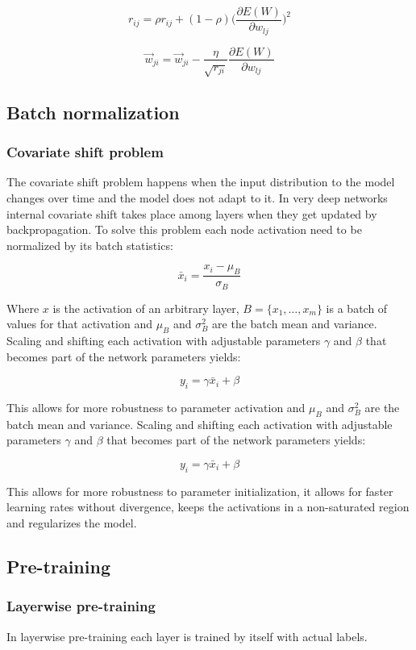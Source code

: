 		$$r_{ij} = \rho r_{ij} + (1-\rho)\biggl(\frac{\partial E(W)}{\partial w_{lj}}\biggr)^2$$

		$$\vec{w}_{ji} = \vec{w}_{ji} -\frac{\eta}{\sqrt{r_{ji}}}\frac{\partial E(W)}{\partial w_{lj}}$$

	\subsection{Batch normalization}

		\subsubsection{Covariate shift problem}
		The covariate shift problem happens when the input distribution to the model changes over time and the model does not adapt to it.
		In very deep networks internal covariate shift takes place among layers when they get updated by backpropagation.
		To solve this problem each node activation need to be normalized by its batch statistics:

		$$\bar{x}_i = \frac{x_i-\mu_B}{\sigma_B}$$

		Where $x$ is the activation of an arbitrary layer, $B = \{x_1, \dots, x_m\}$ is a batch of values for that activation and $\mu_B$ and $\sigma^2_B$ are the batch mean and variance.
		Scaling and shifting each activation with adjustable parameters $\gamma$ and $\beta$ that becomes part of the network parameters yields:

		$$y_i = \gamma\bar{x}_i+\beta$$

		This allows for more robustness to parameter activation and $\mu_B$ and $\sigma^2_B$ are the batch mean and variance.
		Scaling and shifting each activation with adjustable parameters $\gamma$ and $\beta$ that becomes part of the network parameters yields:

		$$y_i = \gamma\bar{x}_i+\beta$$

		This allows for more robustness to parameter initialization, it allows for faster learning rates without divergence, keeps the activations in a non-saturated region and regularizes the model.

	\subsection{Pre-training}

		\subsubsection{Layerwise pre-training}
		In layerwise pre-training each layer is trained by itself with actual labels.

